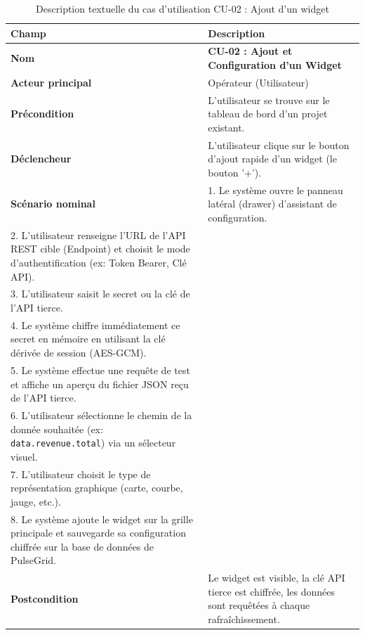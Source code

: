 ﻿\documentclass[12pt,a4paper,oneside]{report} %
\begin{document}
\begin{table}[H]
\centering
\begin{tabularx}{\textwidth}{|l|X|}
\hline
\textbf{Champ} & \textbf{Description} \\ \hline
\textbf{Nom} & \textbf{CU-02 : Ajout et Configuration d'un Widget} \\ \hline
\textbf{Acteur principal} & Opérateur (Utilisateur) \\ \hline
\textbf{Précondition} & L'utilisateur se trouve sur le tableau de bord d'un projet existant. \\ \hline
\textbf{Déclencheur} & L'utilisateur clique sur le bouton d'ajout rapide d'un widget (le bouton '+'). \\ \hline
\textbf{Scénario nominal} & 
1. Le système ouvre le panneau latéral (drawer) d'assistant de configuration.\\
2. L'utilisateur renseigne l'URL de l'API REST cible (Endpoint) et choisit le mode d'authentification (ex: Token Bearer, Clé API).\\
3. L'utilisateur saisit le secret ou la clé de l'API tierce.\\
4. Le système chiffre immédiatement ce secret en mémoire en utilisant la clé dérivée de session (AES-GCM).\\
5. Le système effectue une requête de test et affiche un aperçu du fichier JSON reçu de l'API tierce.\\
6. L'utilisateur sélectionne le chemin de la donnée souhaitée (ex: \texttt{data.revenue.total}) via un sélecteur visuel.\\
7. L'utilisateur choisit le type de représentation graphique (carte, courbe, jauge, etc.).\\
8. Le système ajoute le widget sur la grille principale et sauvegarde sa configuration chiffrée sur la base de données de PulseGrid. \\ \hline
\textbf{Postcondition} & Le widget est visible, la clé API tierce est chiffrée, les données sont requêtées à chaque rafraîchissement. \\ \hline
\end{tabularx}
\caption{Description textuelle du cas d'utilisation CU-02 : Ajout d'un widget}
\end{table}
\end{document}
